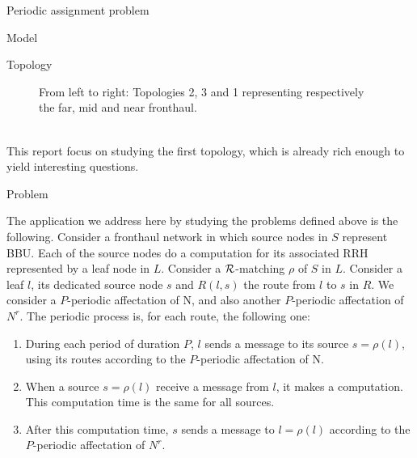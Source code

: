 \documentclass[a4paper,10pt]{report}
\begin{document}
\begin{chapter}{Periodic assignment problem}
\begin{section}{Model}
\begin{subsection}{Topology}
{{\begin{figure}[H]
\begin{center}
\end{center}
\caption{From left to right: Topologies 2, 3 and 1 representing respectively the far, mid and near fronthaul.}
\end{figure}
}}\\

This report focus on studying the first topology, which is already rich enough to yield interesting questions.

\end{subsection}

\end{section}
\begin{section}{Problem}
   
The application we address here by studying the problems defined above is the following. Consider a fronthaul network in which source nodes in $S$ represent BBU.
Each of the source nodes do a computation for its associated RRH represented by a leaf node in $L$. Consider a ${\cal R}$-matching $\rho$ of $S$ in $L$. Consider a leaf $l$, its dedicated source node $s$
and $R(l,s)$ the route from $l$ to $s$ in $R$. We consider a $P$-periodic affectation of N, and also another $P$-periodic affectation of $N^{r}$.
The periodic process is, for each route, the following one:
\begin{enumerate}
 \item During each period of duration $P$, $l$ sends a message to its source $s=\rho(l)$, using its routes according to the $P$-periodic affectation of N. 
 \item When a source $s=\rho(l)$ receive a message from $l$, it makes a computation. This computation time is the same for all sources.
 \item After this computation time, $s$ sends a message to $l=\rho(l)$ according to the $P$-periodic affectation of $N^{r}$.
\end{enumerate}

\begin{center}
\end{center}
\end{section}
\end{chapter}
\end{document}

